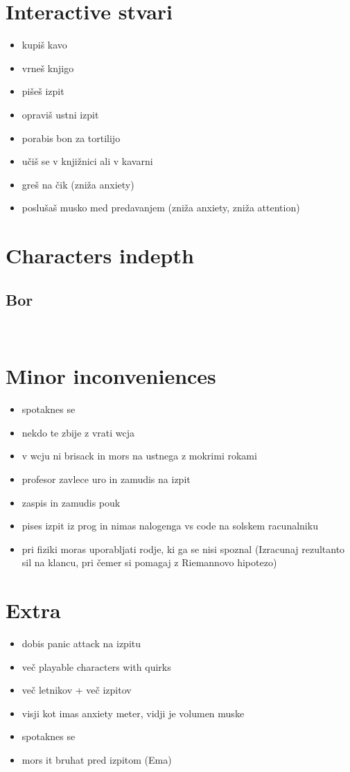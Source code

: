 \documentclass[a4paper]{article}
\begin{document}
\section{Interactive stvari}
\begin{itemize}
    \item kupiš kavo
    \item vrneš knjigo
    \item pišeš izpit
    \item opraviš ustni izpit
    \item porabis bon za tortilijo
    \item učiš se v knjižnici ali v kavarni
    \item greš na čik (zniža anxiety)
    \item poslušaš musko med predavanjem (zniža anxiety, zniža attention)
\end{itemize}

\section{Characters indepth}
\subsection*{Bor}
\

\section{Minor inconveniences}
\begin{itemize}
    \item spotaknes se
    \item nekdo te zbije z vrati wcja
    \item v wcju ni brisack in mors na ustnega z mokrimi rokami
    \item profesor zavlece uro in zamudis na izpit
    \item zaspis in zamudis pouk
    \item pises izpit iz prog in nimas nalogenga vs code na solskem racunalniku
    \item pri fiziki moras uporabljati rodje, ki ga se nisi spoznal (Izracunaj rezultanto sil na klancu, pri čemer si pomagaj z Riemannovo hipotezo)
\end{itemize}

\section{Extra}
\begin{itemize}
    \item dobis panic attack na izpitu
    \item več playable characters with quirks
    \item več letnikov + več izpitov
    \item visji kot imas anxiety meter, vidji je volumen muske
    \item spotaknes se
    \item mors it bruhat pred izpitom (Ema)
\end{itemize}
\end{document}
